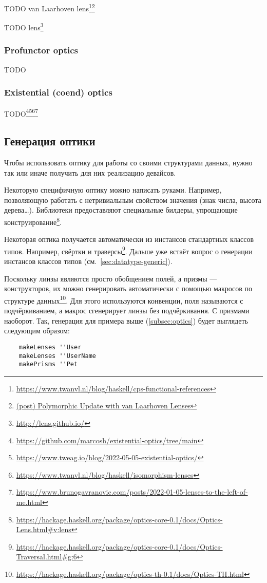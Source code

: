TODO van Laarhoven lens\footnote{\url{https://www.twanvl.nl/blog/haskell/cps-functional-references}}\footnote{\href{http://r6.ca/blog/20120623T104901Z.html}{(post) Polymorphic Update with van Laarhoven Lenses}} %

TODO lens\footnote{\url{http://lens.github.io/}} %


\subsubsection{Profunctor optics}

TODO %


\subsubsection{Existential (coend) optics}

TODO\footnote{\url{https://github.com/marcosh/existential-optics/tree/main}}\footnote{\url{https://www.tweag.io/blog/2022-05-05-existential-optics/}}\footnote{\url{https://www.twanvl.nl/blog/haskell/isomorphism-lenses}}\footnote{\url{https://www.brunogavranovic.com/posts/2022-01-05-lenses-to-the-left-of-me.html}} %


\subsection{Генерация оптики}

Чтобы использовать оптику для работы со своими структурами данных, нужно так или иначе получить для них реализацию девайсов.

Некоторую специфичную оптику можно написать руками.
Например, позволяющую работать с нетривиальным свойством значения (знак числа, высота дерева\ldots).
Библиотеки предоставляют специальные билдеры, упрощающие конструирование\footnote{\url{https://hackage.haskell.org/package/optics-core-0.1/docs/Optics-Lens.html\#v:lens}}.

Некоторая оптика получается автоматически из инстансов стандартных классов типов.
Например, свёртки и траверсы\footnote{\url{https://hackage.haskell.org/package/optics-core-0.1/docs/Optics-Traversal.html\#g:6}}.
Дальше уже встаёт вопрос о генерации инстансов классов типов (см.~\ref{sec:datatype-generic}).

Поскольку линзы являются просто обобщением полей, а призмы --- конструкторов, их можно генерировать автоматически с помощью макросов по структуре данных\footnote{\url{https://hackage.haskell.org/package/optics-th-0.1/docs/Optics-TH.html}}.
Для этого используются конвенции, поля называются с подчёркиванием, а макрос сгенерирует линзы без подчёркивания.
С призмами наоборот.
Так, генерация для примера выше (\ref{subsec:optics}) будет выглядеть следующим образом:
\begin{verbatim}
    makeLenses ''User
    makeLenses ''UserName
    makePrisms ''Pet
\end{verbatim}


